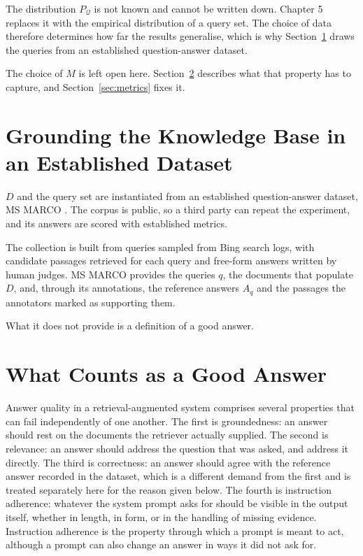 \documentclass[12pt,a4paper,oneside]{scrreprt}
\begin{document}
The distribution $P_{\mathcal{Q}}$ is not known and cannot be written down. Chapter 5 replaces it with the empirical distribution of a query set. The choice of data therefore determines how far the results generalise, which is why Section~\ref{sec:knowledgebase} draws the queries from an established question-answer dataset.

The choice of $M$ is left open here. Section~\ref{sec:goodanswer} describes what that property has to capture, and Section~\ref{sec:metrics} fixes it.

\section{Grounding the Knowledge Base in an Established Dataset}
\label{sec:knowledgebase}

$D$ and the query set are instantiated from an established question-answer dataset, MS MARCO \citep{nguyen2016msmarco}. The corpus is public, so a third party can repeat the experiment, and its answers are scored with established metrics.

The collection is built from queries sampled from Bing search logs, with candidate passages retrieved for each query and free-form answers written by human judges. MS MARCO provides the queries $q$, the documents that populate $D$, and, through its annotations, the reference answers $A_q$ and the passages the annotators marked as supporting them.

What it does not provide is a definition of a good answer. 

\section{What Counts as a Good Answer}
\label{sec:goodanswer}
Answer quality in a retrieval-augmented system comprises several properties that can fail independently of one another. The first is groundedness: an answer should rest on the documents the retriever actually supplied. The second is relevance: an answer should address the question that was asked, and address it directly. The third is correctness: an answer should agree with the reference answer recorded in the dataset, which is a different demand from the first and is treated separately here for the reason given below. The fourth is instruction adherence: whatever the system prompt asks for should be visible in the output itself, whether in length, in form, or in the handling of missing evidence. Instruction adherence is the property through which a prompt is meant to act, although a prompt can also change an answer in ways it did not ask for.
\end{document}
